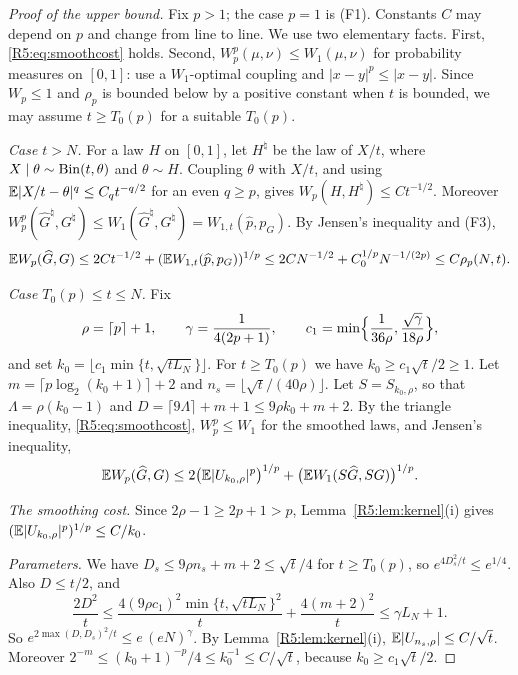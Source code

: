 \documentclass[11pt]{amsart}
\theoremstyle{definition}
\theoremstyle{remark}
\begin{document}
\begin{proof}[Proof of the upper bound]
Fix $p>1$; the case $p=1$ is (F1).  Constants $C$ may depend on $p$ and
change from line to line.  We use two elementary facts.  First,
\eqref{R5:eq:smoothcost} holds.  Second, $W_p^p(\mu,\nu)\le W_1(\mu,\nu)$
for probability measures on $[0,1]$: use a $W_1$-optimal coupling and
$|x-y|^p\le|x-y|$.  Since $W_p\le1$ and $\rho_p$ is bounded below by a
positive constant when $t$ is bounded, we may assume $t\ge T_0(p)$ for a
suitable $T_0(p)$.

\emph{Case $t>N$.}  For a law $H$ on $[0,1]$, let $H^\natural$ be the law of
$X/t$, where $X\mid\theta\sim\operatorname{Bin}(t,\theta)$ and $\theta\sim H$.  Coupling
$\theta$ with $X/t$, and using $\mathbb{E}|X/t-\theta|^{q}\le C_qt^{-q/2}$ for an
even $q\ge p$, gives $W_p(H,H^\natural)\le Ct^{-1/2}$.  Moreover
$W_p^p(\widehat G^\natural,G^\natural)\le W_1(\widehat G^\natural,G^\natural)=W_{1,t}(\widehat p,p_G)$.
By Jensen's inequality and (F3),
\[
 \mathbb{E} W_p(\widehat G,G)\le2Ct^{-1/2}+(\mathbb{E} W_{1,t}(\widehat p,p_G))^{1/p}
 \le2CN^{-1/2}+C_0^{1/p}N^{-1/(2p)}\le C\rho_p(N,t).
\]

\emph{Case $T_0(p)\le t\le N$.}  Fix
\[
 \rho=\lceil p\rceil+1,\qquad \gamma=\frac1{4(2p+1)},\qquad
 c_1=\min\Bigl\{\frac1{36\rho},\frac{\sqrt\gamma}{18\rho}\Bigr\},
\]
and set $k_0=\lfloor c_1\min\{t,\sqrt{tL_N}\}\rfloor$.  For $t\ge T_0(p)$
we have $k_0\ge c_1\sqrt t/2\ge1$.  Let $m=\lceil p\log_2(k_0+1)\rceil+2$
and $n_s=\lfloor\sqrt t/(40\rho)\rfloor$.  Let $S=S_{k_0,\rho}$, so that
$\Lambda=\rho(k_0-1)$ and $D=\lceil9\Lambda\rceil+m+1\le9\rho k_0+m+2$.  By
the triangle inequality, \eqref{R5:eq:smoothcost}, $W_p^p\le W_1$ for the
smoothed laws, and Jensen's inequality,
\begin{equation}\label{R5:eq:wpchain}
 \mathbb{E} W_p(\widehat G,G)\le2\bigl(\mathbb{E}|U_{k_0,\rho}|^p\bigr)^{1/p}
 +\bigl(\mathbb{E} W_1(S\widehat G,SG)\bigr)^{1/p}.
\end{equation}

\emph{The smoothing cost.}  Since $2\rho-1\ge2p+1>p$,
Lemma~\ref{R5:lem:kernel}(i) gives
$(\mathbb{E}|U_{k_0,\rho}|^p)^{1/p}\le C/k_0$.

\emph{Parameters.}  We have $D_s\le9\rho n_s+m+2\le\sqrt t/4$ for
$t\ge T_0(p)$, so $e^{4D_s^2/t}\le e^{1/4}$.  Also $D\le t/2$, and
\[
 \frac{2D^2}{t}\le\frac{4(9\rho c_1)^2\min\{t,\sqrt{tL_N}\}^2}{t}
 +\frac{4(m+2)^2}{t}\le\gamma L_N+1 .
\]
So $e^{2\max(D,D_s)^2/t}\le e\,(eN)^{\gamma}$.  By
Lemma~\ref{R5:lem:kernel}(i), $\mathbb{E}|U_{n_s,\rho}|\le C/\sqrt t$.  Moreover
$2^{-m}\le(k_0+1)^{-p}/4\le k_0^{-1}\le C/\sqrt t$, because
$k_0\ge c_1\sqrt t/2$.


\end{proof}
\end{document}
